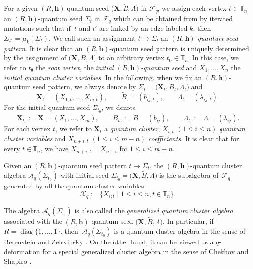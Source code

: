 \documentclass[11pt]{article}
\numberwithin{equation}{section}
\numberwithin{equation}{section}
\begin{document}
 For a given $(R,\mathbf{h})$-quantum seed $\bigl(\mathbf{X}, \tilde{B}, \Lambda\bigr)$ in $\mathcal{F}_q$, we assign each vertex $t\in \mathbb{T}_n$ an $(R,\mathbf{h})$-quantum seed $\Sigma_t$ in $\mathcal{F}_q$ which can be obtained from  by iterated mutations such that if~$t$ and $t'$ are linked by an edge labeled $k$, then $\Sigma_{t'}=\mu_k(\Sigma_t)$. We call such an assignment $t\mapsto \Sigma_t$ an {\it $(R,\mathbf{h})$-quantum seed pattern}. It is clear that an $(R,\mathbf{h})$-quantum seed pattern is uniquely determined by the assignment of $\bigl(\mathbf{X},\tilde{B}, \Lambda\bigr)$ to an arbitrary vertex $t_0\in \mathbb{T}_n$. In this case, we refer to $t_0$ the {\it root vertex},  the {\it initial $(R,\mathbf{h})$-quantum seed} and $X_1,\dots,X_n$ the {\it initial quantum cluster variables}.
 In the following, when we fix an $(R,\mathbf{h})$-quantum seed pattern, we always denote by $\Sigma_t=\bigl(\mathbf{X}_t,\tilde{B}_t,\Lambda_t\bigr)$ and
\[\mathbf{X}_t=(X_{1;t},\dots,X_{m;t}),\qquad \tilde{B}_t=(b_{ij;t}),\qquad \Lambda_t=(\lambda_{ij;t}).
\]
For the initial quantum seed $\Sigma_{t_0}$, we denote
\[
\mathbf{X}_{t_0}:=\mathbf{X}=(X_1,\dots, X_{m}),\qquad \tilde{B}_{t_0}:=\tilde{B}=(b_{ij}), \qquad\Lambda_{t_0}:=\Lambda=(\lambda_{ij}).
\]
For each vertex $t$, we refer to $\mathbf{X}_t$ a {\it quantum cluster}, $X_{i;t}$ $(1\leq i\leq n)$ {\it quantum cluster variables} and $X_{n+i;t}$ $(1\leq i\leq m-n)$ {\it coefficients}.
It is clear that for every $t\in \mathbb{T}_n$, we have $X_{n+i;t}=X_{n+i}$ for $1\leq i\leq m-n$.
\begin{Definition}
 Given an $(R,\mathbf{h})$-quantum seed pattern $t\mapsto \Sigma_t$, the $(R,\mathbf{h})$-quantum cluster algebra $\mathcal{A}_q(\Sigma_{t_0})$ with initial seed $\Sigma_{t_0}=\bigl(\mathbf{X},\tilde{B},\Lambda\bigr)$ is the  subalgebra of~$\mathcal{F}_q$ generated by all the quantum cluster variables
 \[\mathcal{X}_q:=\{X_{i;t}\mid 1\le i\le n, t\in \mathbb{T}_n\}.\]
\end{Definition}
\begin{Remark}
The algebra $\mathcal{A}_q(\Sigma_{t_0})$ is also called the {\it generalized quantum cluster algebra} associated with the $(R,\mathbf{h})$-quantum seed $\bigl(\mathbf{X},\tilde{B},\Lambda\bigr)$. In particular, if $R=\operatorname{diag}\{1,\dots, 1\}$, then~$\mathcal{A}_q(\Sigma_{t_0})$ is a quantum cluster algebra in the sense of Berenstein and Zelevinsky \cite{Berenstein_Zelevinsky2005}. On the other hand, it can be viewed as a $q$-deformation for a special generalized cluster algebra in the sense of Chekhov and Shapiro \cite{Chekhov_Shapiro}.
\end{Remark}
\end{document}
